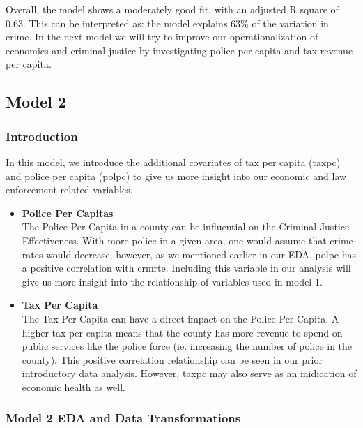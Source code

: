 \documentclass[]{article}
\begin{document}
Overall, the model shows a moderately good fit, with an adjusted R
square of 0.63. This can be interpreted as: the model explains 63\% of
the variation in crime. In the next model we will try to improve our
operationalization of economics and criminal justice by investigating
police per capita and tax revenue per capita.

\hypertarget{model-2}{%
\subsection{Model 2}\label{model-2}}

\hypertarget{introduction-2}{%
\subsubsection{Introduction}\label{introduction-2}}

In this model, we introduce the additional covariates of tax per capita
(taxpc) and police per capita (polpc) to give us more insight into our
economic and law enforcement related variables.

\begin{itemize}
\item
  \textbf{Police Per Capitas}\\
  The Police Per Capita in a county can be influential on the Criminal
  Justice Effectiveness. With more police in a given area, one would
  assume that crime rates would decrease, however, as we mentioned
  earlier in our EDA, polpc has a positive correlation with crmrte.
  Including this variable in our analysis will give us more insight into
  the relationship of variables used in model 1.
\item
  \textbf{Tax Per Capita}\\
  The Tax Per Capita can have a direct impact on the Police Per Capita.
  A higher tax per capita means that the county has more revenue to
  spend on public services like the police force (ie. increasing the
  number of police in the county). This positive correlation
  relationship can be seen in our prior introductory data analysis.
  However, taxpc may also serve as an inidication of economic health as
  well.
\end{itemize}

\hypertarget{model-2-eda-and-data-transformations}{%
\subsubsection{Model 2 EDA and Data
Transformations}\label{model-2-eda-and-data-transformations}}
\end{document}

